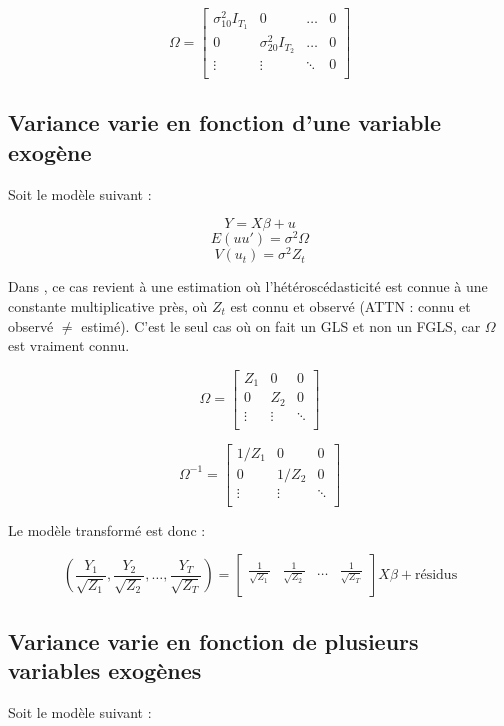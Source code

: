\documentclass[14pt]{extarticle} %
\theoremstyle{definition}
\theoremstyle{plain}
\begin{document}
\[
\Omega =
\begin{bmatrix}
\sigma_{10}^2 I_{T_1} & 0 & \dots & 0 \\
0 & \sigma_{20}^2 I_{T_2} & \dots & 0 \\
\vdots & \vdots & \ddots & 0 \\
\end{bmatrix}
\]

\subsection{Variance varie en fonction d'une variable exogène}
Soit le modèle suivant :

\[
Y = X\beta + u
\]
\[
E(uu') = \sigma^2 \Omega
\]
\[
V(u_t) = \sigma^2 Z_t
\]

Dans \textbf{\textcolor{blue}{\cite{wooldridge2010}}}, ce cas revient à une estimation où l’hétéroscédasticité est connue à une constante multiplicative près, où $Z_t$ est connu et observé (ATTN : connu et observé $\neq$ estimé). C'est le seul cas où on fait un GLS et non un FGLS, car $\Omega$ est vraiment connu.

\[
\Omega =
\begin{bmatrix}
Z_1 & 0 & 0 \\
0 & Z_2 & 0 \\
\vdots & \vdots & \ddots \\
\end{bmatrix}
\]

\[
\Omega^{-1} =
\begin{bmatrix}
1/Z_1 & 0 & 0 \\
0 & 1/Z_2 & 0 \\
\vdots & \vdots & \ddots \\
\end{bmatrix}
\]

Le modèle transformé est donc :

\[
\left( \frac{Y_1}{\sqrt{Z_1}}, \frac{Y_2}{\sqrt{Z_2}}, \dots, \frac{Y_T}{\sqrt{Z_T}} \right) = \left[
\begin{array}{ccc}
\frac{1}{\sqrt{Z_1}} & \frac{1}{\sqrt{Z_2}} & \dots & \frac{1}{\sqrt{Z_T}} \\
\end{array}
\right] X\beta + \text{résidus}
\]

\subsection{Variance varie en fonction de plusieurs variables exogènes}
Soit le modèle suivant :
\end{document}
